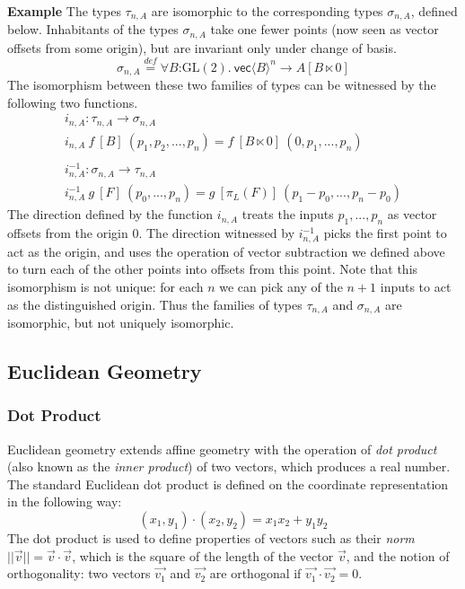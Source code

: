 \documentclass{article}
\newcommand{\GL}{\mathrm{GL}}
\newcommand{\isDefinedAs}{\stackrel{\mathit{def}}=}
\newenvironment{example}{\vspace{0.1in}\noindent\textbf{Example}\quad}{}
\begin{document}
\begin{example}
  The types $\tau_{n,A}$ are isomorphic to the corresponding types
  $\sigma_{n,A}$, defined below. Inhabitants of the types
  $\sigma_{n,A}$ take one fewer points (now seen as vector offsets
  from some origin), but are invariant only under change of basis.
  \begin{displaymath}
    \sigma_{n,A} \isDefinedAs \forall B\mathord:\GL(2).\ \mathsf{vec}\langle B \rangle^n \to A[B \ltimes 0]
  \end{displaymath}
  The isomorphism between these two families of types can be witnessed
  by the following two functions.
  \begin{displaymath}
    \begin{array}{l}
      i_{n,A} : \tau_{n,A} \to \sigma_{n,A} \\
      i_{n,A}\ f\ [B]\ (p_1, p_2, ..., p_n) = f\ [B \ltimes 0]\ (0, p_1, ..., p_n) \\
      \\
      i^{-1}_{n,A} : \sigma_{n,A} \to \tau_{n,A} \\
      i^{-1}_{n,A}\ g\ [F]\ (p_0, ..., p_n) = g\ [\pi_L(F)]\ (p_1-p_0, ..., p_n-p_0)
    \end{array}
  \end{displaymath}
  The direction defined by the function $i_{n,A}$ treats the inputs
  $p_1,...,p_n$ as vector offsets from the origin $0$. The direction
  witnessed by $i^{-1}_{n,A}$ picks the first point to act as the
  origin, and uses the operation of vector subtraction we defined
  above to turn each of the other points into offsets from this
  point. Note that this isomorphism is not unique: for each $n$ we can
  pick any of the $n+1$ inputs to act as the distinguished
  origin. Thus the families of types $\tau_{n,A}$ and $\sigma_{n,A}$
  are isomorphic, but not uniquely isomorphic.
\end{example}

\subsection{Euclidean Geometry}
\label{sec:euclidean-geom}

\subsubsection{Dot Product}

Euclidean geometry extends affine geometry with the operation of
\emph{dot product} (also known as the \emph{inner product}) of two
vectors, which produces a real number. The standard Euclidean dot
product is defined on the coordinate representation in the following
way:
\begin{displaymath}
  (x_1,y_1) \cdot (x_2,y_2) = x_1x_2 + y_1y_2
\end{displaymath}
The dot product is used to define properties of vectors such as their
\emph{norm} $||\vec{v}|| = \vec{v}\cdot\vec{v}$, which is the square
of the length of the vector $\vec{v}$, and the notion of
orthogonality: two vectors $\vec{v_1}$ and $\vec{v_2}$ are orthogonal
if $\vec{v_1}\cdot\vec{v_2} = 0$.
\end{document}
